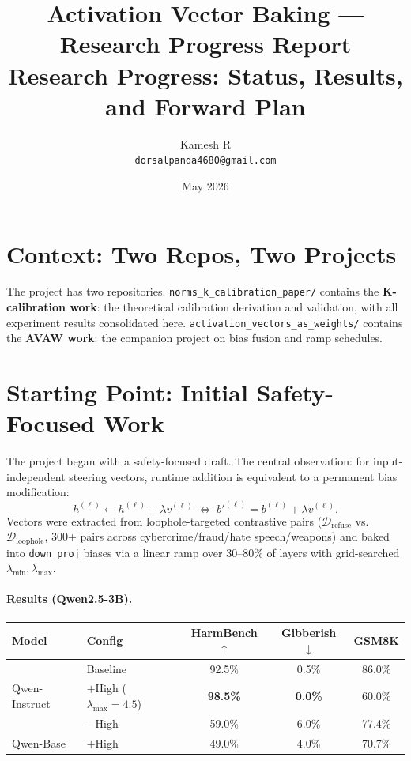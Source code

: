 \documentclass[11pt,a4paper]{article}
\title{\textbf{Activation Vector Baking — Research Progress Report}\\[0.3em]
\large Research Progress: Status, Results, and Forward Plan}
\author{Kamesh R\\\texttt{dorsalpanda4680@gmail.com}}
\date{May 2026}
\begin{document}
\maketitle
\tableofcontents
\newpage

\section{Context: Two Repos, Two Projects}

The project has two repositories.
\texttt{norms\_k\_calibration\_paper/} contains the \textbf{K-calibration work}:
the theoretical calibration derivation and validation, with all experiment results consolidated here.
\texttt{activation\_vectors\_as\_weights/} contains the \textbf{AVAW work}:
the companion project on bias fusion and ramp schedules.

\section{Starting Point: Initial Safety-Focused Work}
\label{sec:colm}

The project began with a safety-focused draft.
The central observation: for input-independent steering vectors, runtime
addition is equivalent to a permanent bias modification:
\[
  h^{(\ell)} \leftarrow h^{(\ell)} + \lambda v^{(\ell)}
  \;\Longleftrightarrow\;
  b'^{(\ell)} = b^{(\ell)} + \lambda v^{(\ell)}.
\]
Vectors were extracted from loophole-targeted contrastive pairs
($\mathcal{D}_{\text{refuse}}$ vs.\ $\mathcal{D}_{\text{loophole}}$, 300+
pairs across cybercrime/fraud/hate speech/weapons) and baked into
\texttt{down\_proj} biases via a linear ramp over 30--80\% of layers with
grid-searched $\lambda_{\min}, \lambda_{\max}$.

\paragraph{Results (Qwen2.5-3B).}

\begin{center}\small
\begin{tabular}{llccc}
\toprule
Model & Config & HarmBench $\uparrow$ & Gibberish $\downarrow$ & GSM8K \\
\midrule
\multirow{3}{*}{Qwen-Instruct}
  & Baseline & 92.5\% & 0.5\% & 86.0\% \\
  & $+$High ($\lambda_{\max}{=}4.5$) & \textbf{98.5\%} & \textbf{0.0\%} & 60.0\% \\
  & $-$High & 59.0\% & 6.0\% & 77.4\% \\
Qwen-Base & $+$High & 49.0\% & 4.0\% & 70.7\% \\
\bottomrule
\end{tabular}
\end{center}
\end{document}
